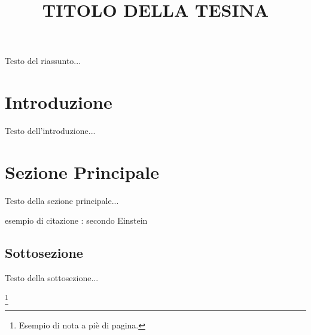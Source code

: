 \documentclass[a4paper,12pt]{article}
\title{\fontsize{14}{17}\bfseries\uppercase{Titolo della Tesina}}
\author{}
\date{}
\begin{document}
\maketitle
\thispagestyle{empty}

\begin{center}
    \vspace{1cm}
    \textbf{\fontsize{12}{15}\selectfont{Riassunto}}
\end{center}

Testo del riassunto...

\tableofcontents  


\newpage

\section{Introduzione}
Testo dell'introduzione...

\section{Sezione Principale}
Testo della sezione principale...

esempio di citazione : secondo Einstein \cite{einstein1905}
\subsection{Sottosezione}
Testo della sottosezione...

\footnote{Esempio di nota a piè di pagina.}



\newpage %


\end{document}
